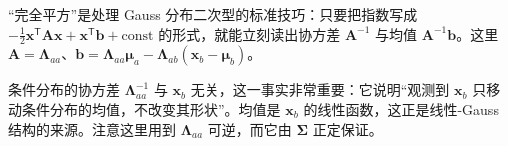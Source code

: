 \documentclass[../../main.tex]{subfiles}
\begin{document}
\begin{remark}
“完全平方”是处理 Gauss 分布二次型的标准技巧：只要把指数写成 $-\frac12\boldsymbol{x}^{\mathsf{T}}\boldsymbol{A}\boldsymbol{x}+\boldsymbol{x}^{\mathsf{T}}\boldsymbol{b}+\text{const}$ 的形式，就能立刻读出协方差 $\boldsymbol{A}^{-1}$ 与均值 $\boldsymbol{A}^{-1}\boldsymbol{b}$。这里 $\boldsymbol{A}=\boldsymbol{\Lambda}_{aa}$、$\boldsymbol{b}=\boldsymbol{\Lambda}_{aa}\boldsymbol{\mu}_{a}-\boldsymbol{\Lambda}_{ab}(\boldsymbol{x}_{b}-\boldsymbol{\mu}_{b})$。

条件分布的协方差 $\boldsymbol{\Lambda}_{aa}^{-1}$ 与 $\boldsymbol{x}_{b}$ 无关，这一事实非常重要：它说明“观测到 $\boldsymbol{x}_b$ 只移动条件分布的均值，不改变其形状”。均值是 $\boldsymbol{x}_{b}$ 的线性函数，这正是线性-Gauss 结构的来源。注意这里用到 $\boldsymbol{\Lambda}_{aa}$ 可逆，而它由 $\boldsymbol{\Sigma}$ 正定保证。
\end{remark}
\end{document}

